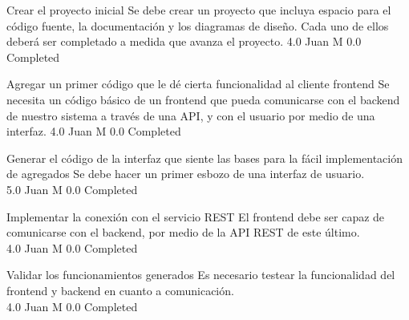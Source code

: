 		{Crear el proyecto inicial} %
		{Se debe crear un proyecto que incluya espacio para el código fuente, la
documentación y los diagramas de diseño. Cada uno de ellos deberá ser
completado a medida que avanza el proyecto.
} %
		{4.0} %
		{Juan M} %
		{0.0} %
		{Completed} %

		{Agregar un primer código que le dé cierta funcionalidad al cliente frontend} %
		{Se necesita un código básico de un frontend que pueda comunicarse con el
backend de nuestro sistema a través de una API, y con el usuario por medio de
una interfaz.
} %
		{4.0} %
		{Juan M} %
		{0.0} %
		{Completed} %

		{Generar el código de la interfaz que siente las bases para la fácil implementación de agregados} %
		{Se debe hacer un primer esbozo de una interfaz de usuario.\\
} %
		{5.0} %
		{Juan M} %
		{0.0} %
		{Completed} %

		{Implementar la conexión con el servicio REST} %
		{El frontend debe ser capaz de comunicarse con el backend, por medio de la API
REST de este último.\\
} %
		{4.0} %
		{Juan M} %
		{0.0} %
		{Completed} %

		{Validar los funcionamientos generados} %
		{Es necesario testear la funcionalidad del frontend y backend en cuanto a
comunicación.\\
} %
		{4.0} %
		{Juan M} %
		{0.0} %
		{Completed} %


\vspace{20pt}

